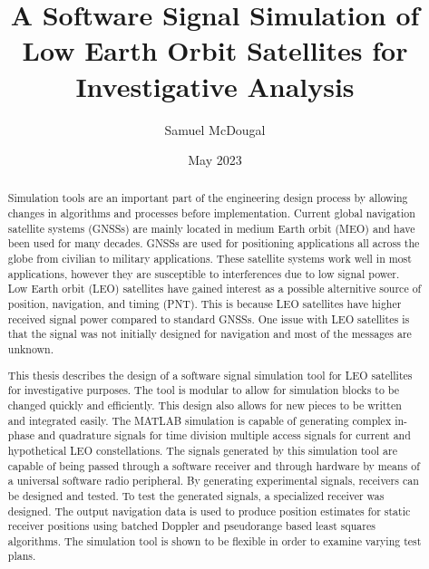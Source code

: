 \documentclass[12pt]{report}
\title{A Software Signal Simulation of Low Earth Orbit Satellites for Investigative Analysis}
\author{Samuel McDougal}
\date{May 2023} %
\begin{document}
\begin{romanpages}      %

\TitlePage 

\begin{abstract} 
Simulation tools are an important part of the engineering design process by allowing changes in algorithms and processes before  implementation. Current global navigation satellite systems (GNSSs) are mainly located in medium Earth orbit (MEO) and have been used for many decades. GNSSs are used for positioning applications all across the globe from civilian to military applications. These satellite systems work well in most applications, however they are susceptible to interferences due to low signal power. Low Earth orbit (LEO) satellites have gained interest as a possible alternitive source of position, navigation, and timing (PNT). This is because LEO satellites have higher received signal power compared to standard GNSSs. One issue with LEO satellites is that the signal was not initially designed for navigation and most of the messages are unknown. 

This thesis describes the design of a software signal simulation tool for LEO satellites for investigative purposes. The tool is modular to allow for simulation blocks to be changed quickly and efficiently. This design also allows for new pieces to be written and integrated easily. The MATLAB simulation is capable of generating complex in-phase and quadrature signals for time division multiple access signals for current and hypothetical LEO constellations. The signals generated by this simulation tool are capable of being passed through a software receiver and through hardware by means of a universal software radio peripheral. By generating experimental signals, receivers can be designed and tested. To test the generated signals, a specialized receiver was designed. The output navigation data is used to produce position estimates for static receiver positions using batched Doppler and pseudorange based least squares algorithms. The simulation tool is shown to be flexible in order to examine varying test plans. 


\end{abstract}


\end{romanpages}
\end{document}

